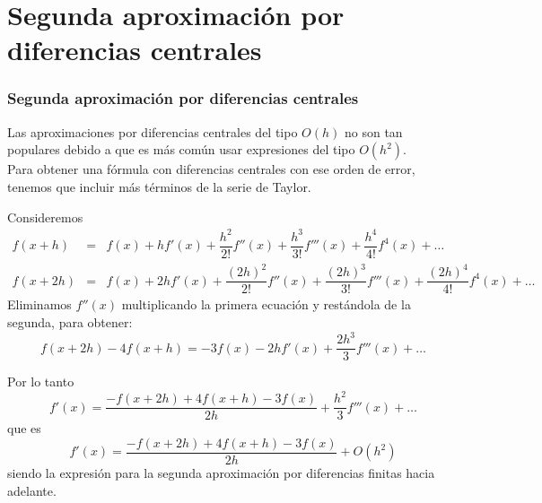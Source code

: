 \section{Segunda aproximación por diferencias centrales}
\begin{frame}
\frametitle{Segunda aproximación por diferencias centrales}
Las aproximaciones por diferencias centrales del tipo $O(h)$ no son tan populares debido a que es más común usar expresiones del tipo $O(h^{2})$.
\\
\bigskip
Para obtener una fórmula con diferencias centrales con ese orden de error, tenemos que incluir más términos de la serie de Taylor.
\end{frame}
\begin{frame}
\fontsize{11}{11}\selectfont
Consideremos
\begin{eqnarray*}
f(x+h) &=& f(x) + hf'(x) + \dfrac{h^{2}}{2!}f''(x) + \dfrac{h^{3}}{3!}f'''(x) + \dfrac{h^{4}}{4!}f^{4}(x) + \ldots \\
f(x+2h) &=& f(x) + 2hf'(x) + \dfrac{(2h)^{2}}{2!}f''(x) + \dfrac{(2h)^{3}}{3!}f'''(x) + \dfrac{(2h)^{4}}{4!}f^{4}(x) + \ldots
\end{eqnarray*}
Eliminamos $f''(x)$ multiplicando la primera ecuación y restándola de la segunda, para obtener:
\[ f(x+2h) - 4f(x+h) = -3 f(x) - 2 hf'(x) + \dfrac{2h^{3}}{3} f'''(x) + \ldots\]
\end{frame}
\begin{frame}
Por lo tanto
\[ f'(x) = \dfrac{-f(x+2h) + 4 f(x+h) - 3 f(x)}{2h} + \dfrac{h^{2}}{3}f'''(x) + \ldots\]
que es
\[ f'(x) = \dfrac{-f(x+2h) + 4 f(x+h) - 3 f(x)}{2h} + O(h^{2})\]
siendo la expresión para la segunda aproximación por diferencias finitas hacia adelante.
\end{frame}
